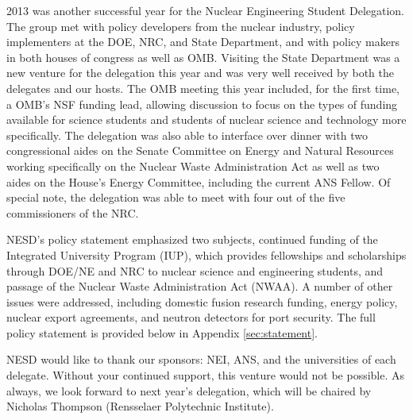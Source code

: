 
2013 was another successful year for the Nuclear Engineering Student
Delegation. The group met with policy developers from the nuclear industry,
policy implementers at the DOE, NRC, and State Department, and with policy
makers in both houses of congress as well as OMB. Visiting the State Department
was a new venture for the delegation this year and was very well received by
both the delegates and our hosts. The OMB meeting this year included, for the
first time, a OMB's NSF funding lead, allowing discussion to focus on the types
of funding available for science students and students of nuclear science and
technology more specifically. The delegation was also able to interface over
dinner with two congressional aides on the Senate Committee on Energy and
Natural Resources working specifically on the Nuclear Waste Administration Act
as well as two aides on the House's Energy Committee, including the current ANS
Fellow. Of special note, the delegation was able to meet with four out of the
five commissioners of the NRC.

NESD's policy statement emphasized two subjects, continued funding of the
Integrated University Program (IUP), which provides fellowships and scholarships
through DOE/NE and NRC to nuclear science and engineering students, and passage
of the Nuclear Waste Administration Act (NWAA). A number of other issues were
addressed, including domestic fusion research funding, energy policy, nuclear
export agreements, and neutron detectors for port security. The full policy
statement is provided below in Appendix \ref{sec:statement}.

NESD would like to thank our sponsors: NEI, ANS, and the universities of each
delegate. Without your continued support, this venture would not be possible. As
always, we look forward to next year's delegation, which will be chaired by
Nicholas Thompson (Rensselaer Polytechnic Institute).

